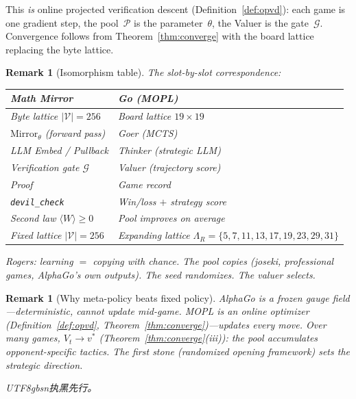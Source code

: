\documentclass[11pt,a4paper]{article}
\newtheorem{remark}[theorem]{Remark}
\newcommand{\cV}{\mathcal{V}}
\newcommand{\cG}{\mathcal{G}}
\newcommand{\cP}{\mathcal{P}}
\newcommand{\Mirror}{\mathrm{Mirror}}
\begin{document}
This \emph{is} online projected verification descent
(Definition~\ref{def:opvd}):
each game is one gradient step,
the pool~$\cP$ is the parameter~$\theta$,
the Valuer is the gate~$\cG$.
Convergence follows from Theorem~\ref{thm:converge}
with the board lattice replacing the byte lattice.

\begin{remark}[Isomorphism table]\label{rem:go-iso}
The slot-by-slot correspondence:

\medskip
\begin{center}
\begin{tabular}{@{}ll@{}}
\toprule
\textbf{Math Mirror} & \textbf{Go (MOPL)} \\
\midrule
Byte lattice $|\cV| = 256$ & Board lattice $19 \times 19$ \\
$\Mirror_\theta$ (forward pass) & Goer (MCTS) \\
LLM Embed / Pullback & Thinker (strategic LLM) \\
Verification gate $\cG$ & Valuer (trajectory score) \\
Proof & Game record \\
\texttt{devil\_check} & Win/loss $+$ strategy score \\
Second law $\langle W \rangle \geq 0$ & Pool improves on average \\
Fixed lattice $|\cV| = 256$ & Expanding lattice $\Lambda_R = \{5, 7, 11, 13, 17, 19, 23, 29, 31\}$ \\
\bottomrule
\end{tabular}
\end{center}
\medskip

\noindent
Rogers: learning $=$ copying with chance.
The pool copies (joseki, professional games, AlphaGo's own outputs).
The seed randomizes.
The valuer selects.
\end{remark}

\begin{remark}[Why meta-policy beats fixed policy]\label{rem:meta-policy}
AlphaGo is a frozen gauge field---deterministic,
cannot update mid-game.
MOPL is an online optimizer
(Definition~\ref{def:opvd}, Theorem~\ref{thm:converge})---updates
every move.
Over many games, $V_t \to v^*$
(Theorem~\ref{thm:converge}(iii)):
the pool accumulates opponent-specific tactics.
The first stone (randomized opening framework) sets the
strategic direction.
\begin{CJK}{UTF8}{gbsn}执黑先行。\end{CJK}
\end{remark}
\end{document}
